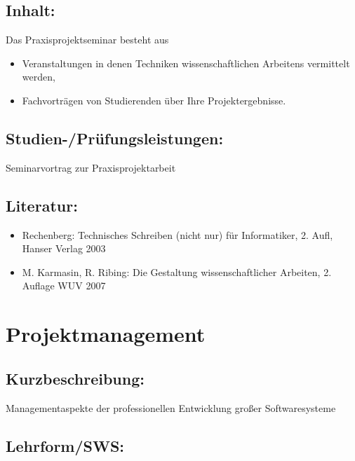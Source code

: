 \section*{Inhalt:}\label{inhalt-19}

Das Praxisprojektseminar besteht aus

\begin{itemize}
\item
  Veranstaltungen in denen Techniken wissenschaftlichen Arbeitens
  vermittelt werden,
\item
  Fachvorträgen von Studierenden über Ihre Projektergebnisse.
\end{itemize}

\section*{Studien-/Prüfungsleistungen:}\label{studien-pruxfcfungsleistungen-14}

Seminarvortrag zur Praxisprojektarbeit

\section*{Literatur:}\label{literatur-15}

\begin{itemize}
\item
  Rechenberg: Technisches Schreiben (nicht nur) für Informatiker, 2.
  Aufl, Hanser Verlag 2003
\item
  M. Karmasin, R. Ribing: Die Gestaltung wissenschaftlicher Arbeiten, 2.
  Auflage WUV 2007
\end{itemize}

\chapter{Projektmanagement}\label{projektmanagement}

\section*{Kurzbeschreibung:}\label{kurzbeschreibung-2}

Managementaspekte der professionellen Entwicklung großer Softwaresysteme

\section*{Lehrform/SWS:}\label{lehrformsws-16}

